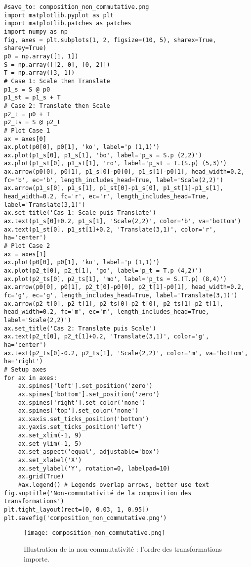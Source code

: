 \begin{verbatim}
#save_to: composition_non_commutative.png
import matplotlib.pyplot as plt
import matplotlib.patches as patches
import numpy as np
fig, axes = plt.subplots(1, 2, figsize=(10, 5), sharex=True, sharey=True)
p0 = np.array([1, 1])
S = np.array([[2, 0], [0, 2]])
T = np.array([3, 1])
# Case 1: Scale then Translate
p1_s = S @ p0
p1_st = p1_s + T
# Case 2: Translate then Scale
p2_t = p0 + T
p2_ts = S @ p2_t
# Plot Case 1
ax = axes[0]
ax.plot(p0[0], p0[1], 'ko', label='p (1,1)')
ax.plot(p1_s[0], p1_s[1], 'bo', label='p_s = S.p (2,2)')
ax.plot(p1_st[0], p1_st[1], 'ro', label='p_st = T.(S.p) (5,3)')
ax.arrow(p0[0], p0[1], p1_s[0]-p0[0], p1_s[1]-p0[1], head_width=0.2, fc='b', ec='b', length_includes_head=True, label='Scale(2,2)')
ax.arrow(p1_s[0], p1_s[1], p1_st[0]-p1_s[0], p1_st[1]-p1_s[1], head_width=0.2, fc='r', ec='r', length_includes_head=True, label='Translate(3,1)')
ax.set_title('Cas 1: Scale puis Translate')
ax.text(p1_s[0]+0.2, p1_s[1], 'Scale(2,2)', color='b', va='bottom')
ax.text(p1_st[0], p1_st[1]+0.2, 'Translate(3,1)', color='r', ha='center')
# Plot Case 2
ax = axes[1]
ax.plot(p0[0], p0[1], 'ko', label='p (1,1)')
ax.plot(p2_t[0], p2_t[1], 'go', label='p_t = T.p (4,2)')
ax.plot(p2_ts[0], p2_ts[1], 'mo', label='p_ts = S.(T.p) (8,4)')
ax.arrow(p0[0], p0[1], p2_t[0]-p0[0], p2_t[1]-p0[1], head_width=0.2, fc='g', ec='g', length_includes_head=True, label='Translate(3,1)')
ax.arrow(p2_t[0], p2_t[1], p2_ts[0]-p2_t[0], p2_ts[1]-p2_t[1], head_width=0.2, fc='m', ec='m', length_includes_head=True, label='Scale(2,2)')
ax.set_title('Cas 2: Translate puis Scale')
ax.text(p2_t[0], p2_t[1]+0.2, 'Translate(3,1)', color='g', ha='center')
ax.text(p2_ts[0]-0.2, p2_ts[1], 'Scale(2,2)', color='m', va='bottom', ha='right')
# Setup axes
for ax in axes:
    ax.spines['left'].set_position('zero')
    ax.spines['bottom'].set_position('zero')
    ax.spines['right'].set_color('none')
    ax.spines['top'].set_color('none')
    ax.xaxis.set_ticks_position('bottom')
    ax.yaxis.set_ticks_position('left')
    ax.set_xlim(-1, 9)
    ax.set_ylim(-1, 5)
    ax.set_aspect('equal', adjustable='box')
    ax.set_xlabel('X')
    ax.set_ylabel('Y', rotation=0, labelpad=10)
    ax.grid(True)
    #ax.legend() # Legends overlap arrows, better use text
fig.suptitle('Non-commutativité de la composition des transformations')
plt.tight_layout(rect=[0, 0.03, 1, 0.95])
plt.savefig('composition_non_commutative.png')
\end{verbatim}
\begin{figure}[H]
\centering
\texttt{[image: composition\_non\_commutative.png]}
\caption{Illustration de la non-commutativité : l'ordre des transformations importe.}
\label{fig:composition_non_commutative}
\end{figure}
